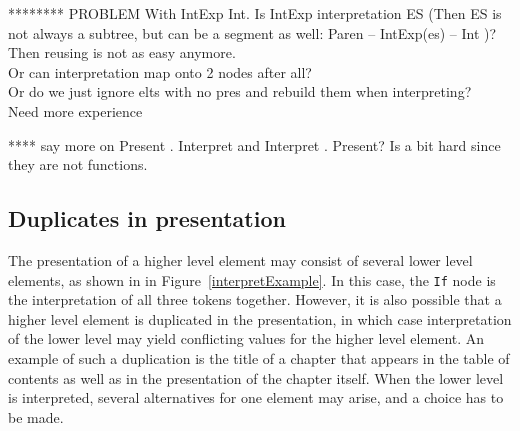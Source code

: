 ******** PROBLEM With IntExp  Int. 
Is IntExp interpretation ES (Then ES is not always a subtree, but can be a segment as well: Paren -- IntExp(es) -- Int )? Then reusing is not as easy anymore.\\
Or can interpretation map onto 2 nodes after all?\\
Or do we just ignore elts with no pres and rebuild them when interpreting?\\
Need more experience



**** say more on Present . Interpret and Interpret . Present? Is a bit hard since they are not functions.

\fromHere  %

%
%





%																
\subsection{Duplicates in presentation}


The presentation of a higher level element may consist of several lower level elements, as shown in in Figure~\ref{interpretExample}. In this case, the \verb|If| node is the interpretation of all three tokens together. However, it is also possible that a higher level element is duplicated in the presentation, in which case interpretation of the lower level may yield conflicting values for the higher level element. An example of such a duplication is the title of a chapter that appears in the table of contents as well as in the presentation of the chapter itself. When the lower level is interpreted, several alternatives for one element may arise, and a choice has to be made.

